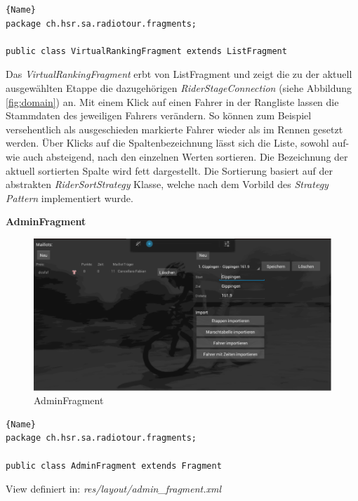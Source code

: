 \begin{lstlisting}{Name}
package ch.hsr.sa.radiotour.fragments;

public class VirtualRankingFragment extends ListFragment
\end{lstlisting}

Das \textit{VirtualRankingFragment} erbt von ListFragment und zeigt die zu der aktuell ausgewählten Etappe die dazugehörigen \textit{RiderStageConnection} (siehe Abbildung \ref{fig:domain}) an. Mit einem Klick auf einen Fahrer in der Rangliste lassen die Stammdaten des jeweiligen Fahrers verändern. So können zum Beispiel versehentlich als ausgeschieden markierte Fahrer wieder als im Rennen gesetzt werden. Über Klicks auf die  Spaltenbezeichnung lässt sich die Liste, sowohl auf- wie auch absteigend, nach den einzelnen Werten sortieren. Die Bezeichnung der aktuell sortierten Spalte wird fett dargestellt. Die Sortierung basiert auf der abstrakten \textit{RiderSortStrategy} Klasse, welche nach dem Vorbild des \textit{Strategy Pattern} implementiert wurde. 

\textbf{AdminFragment}

\begin{figure}[h!]
\caption{AdminFragment}
\label{fig:adminfragment}
\centering
\includegraphics[scale=0.8]{07anhang/images/dev_adminfragment.png}
\end{figure}
\begin{lstlisting}{Name}
package ch.hsr.sa.radiotour.fragments;

public class AdminFragment extends Fragment
\end{lstlisting}


View definiert in:
\textit{res/layout/admin\_fragment.xml} 

